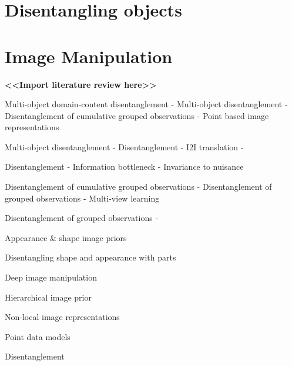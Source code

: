 \section{Disentangling objects}

\section{Image Manipulation}

\textbf{<<Import literature review here>>}



Multi-object domain-content disentanglement
- Multi-object disentanglement
- Disentanglement of cumulative grouped observations
- Point based image representations

Multi-object disentanglement
- Disentanglement
- I2I translation
- 

Disentanglement
- Information bottleneck
- Invariance to nuisance

Disentanglement of cumulative grouped observations
- Disentanglement of grouped observations
- Multi-view learning

Disentanglement of grouped observations
- 

Appearance \& shape image priors
\cite{simakov2008summarizing}
\cite{cootes1999comparing}
\cite{jojic2003epitomic}
\cite{roth2005fields}
\cite{kannan2007clustering}
\cite{ashburner2019algorithm}

Disentangling shape and appearance with parts
\cite{eslami2016attend}
\cite{reed2016learning}
\cite{greff2016tagger}
\cite{lorenz2019unsupervised}
\cite{esser2018variational}

Deep image manipulation
\cite{hong2018learning}
\cite{bau2019semantic}
\cite{park2019semantic}
\cite{liu2020decompose}

Hierarchical image prior
\cite{minnen2018joint}
\cite{gregor2015draw}
\cite{vahdat2020nvae}
\cite{shocher2020semantic}
\cite{shaham2019singan}
\cite{ulyanov2018deep}

Non-local image representations
\cite{wang2018non}
\cite{li2018beyond}
\cite{zhang2019self}

Point data models
\cite{li2018point}
\cite{qi2017pointnet}
\cite{kipf2016semi}

Disentanglement
\cite{siddharth2017learning}
\cite{kim2018disentangling}
\cite{higgins2018towards}
\cite{higgins2016beta}
\cite{mathieu2019disentangling}
\cite{locatello2019challenging}
\cite{tschannen2018recent}

